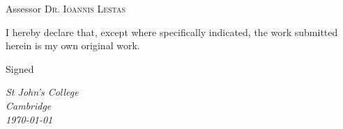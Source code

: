 \documentclass[../main.tex]{subfiles}
\begin{document}
\begin{titlepage}
    Assessor
	\vspace{0.5\baselineskip} %
	{\scshape\Large Dr. Ioannis Lestas} %
	\vspace{1\baselineskip}

	\begin{flushleft}
	\textnormal{I hereby declare that, except where specifically indicated, the work submitted herein is my own original work.}

	\textnormal{Signed \underline{\hspace{3.5cm}}}
	\end{flushleft}

	\vfill %
	\vspace{1\baselineskip} %
    \textit{St John's College \\ Cambridge \\ \today}

\end{titlepage}
\end{document}
